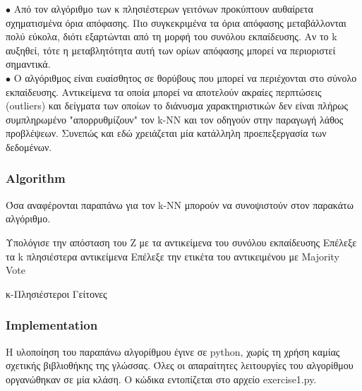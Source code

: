 \documentclass[12pt]{article}
\begin{document}
\(\bullet\) Από τον αλγόριθμο των κ πλησιέστερων γειτόνων προκύπτουν αυθαίρετα σχηματισμένα όρια απόφασης. Πιο συγκεκριμένα τα όρια απόφασης μεταβάλλονται πολύ εύκολα, διότι εξαρτώνται από τη μορφή του συνόλου εκπαίδευσης. Αν το k αυξηθεί, τότε η μεταβλητότητα αυτή των ορίων απόφασης μπορεί να περιοριστεί σημαντικά. \\

\(\bullet\) Ο αλγόριθμος είναι ευαίσθητος σε θορύβους που μπορεί να περιέχονται στο σύνολο εκπαίδευσης. Αντικείμενα τα οποία μπορεί να αποτελούν ακραίες περπτώσεις (outliers) και δείγματα των οποίων το διάνυσμα χαρακτηριστικών δεν είναι πλήρως συμπληρωμένο "απορρυθμίζουν" τον k-NN και τον οδηγούν στην παραγωγή λάθος προβλέψεων. Συνεπώς και εδώ χρειάζεται μία κατάλληλη προεπεξεργασία των δεδομένων. \\


\subsubsection*{Algorithm}

Όσα αναφέρονται παραπάνω για τον k-NN μπορούν να συνοψιστούν στον παρακάτω αλγόριθμο. \\

\begin{algorithm}[H]
	\SetAlgoLined

	{Υπολόγισε την απόσταση του Z με τα αντικείμενα του συνόλου εκπαίδευσης \;
	 Επέλεξε τα k πλησιέστερα αντικείμενα \;
 	Επέλεξε την ετικέτα του αντικειμένου με Majority Vote \;}

	\caption{κ-Πλησιέστεροι Γείτονες}
\end{algorithm}

\subsubsection*{Implementation}

Η υλοποίηση του παραπάνω αλγορίθμου έγινε σε python, χωρίς τη χρήση καμίας σχετικής βιβλιοθήκης της γλώσσας. Όλες οι απαραίτητες λειτουργίες του αλγορίθμου οργανώθηκαν σε μία κλάση. Ο κώδικα εντοπίζεται στο αρχείο exercise1.py. \\
\end{document}
